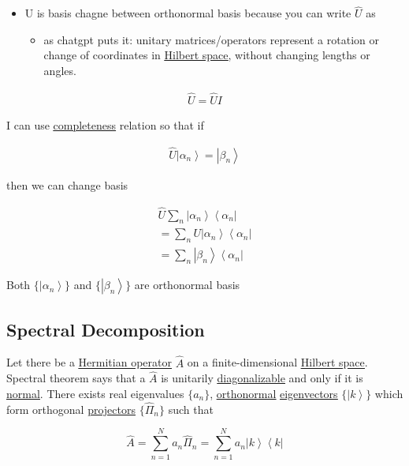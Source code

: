\documentclass[
]{article}
\providecommand{\tightlist}{%
  \setlength{\itemsep}{0pt}\setlength{\parskip}{0pt}}
\let\oldhyperref\hyperref
\renewcommand{\hyperref}[2][]{\oldhyperref[#1]{\underline{#2}}}
\providecommand{\ket}[1]{\left\lvert #1 \right\rangle}
\providecommand{\bra}[1]{\left\langle #1 \right\rvert}
\begin{document}
\begin{itemize}
	\tightlist
	\item
	      U is basis chagne between orthonormal basis because you can write
	      \(\hat{U}\) as

	      \begin{itemize}
		      \tightlist
		      \item
		            as chatgpt puts it: unitary matrices/operators represent a rotation
		            or change of coordinates in \hyperref[hilbert-spaces]{Hilbert space}, without changing lengths
		            or angles.
	      \end{itemize}
\end{itemize}

\begin{gather*}
	\hat{U}=\hat{U}I
\end{gather*}

I can use \hyperref[completeness]{completeness} relation so that if

\begin{gather*}
	\hat{U}\ket{\alpha_n}=\ket{\beta_n}
\end{gather*}

then we can change basis

\begin{gather*}
	\hat{U}\sum_n\ket{\alpha_n}\bra{\alpha_n}\\
	=\sum_nU\ket{\alpha_n}\bra{\alpha_n}\\
	=\sum_n\ket{\beta_n}\bra{\alpha_n}
\end{gather*}

Both \(\{\ket{\alpha_n}\}\) and \(\{\ket{\beta_n}\}\) are orthonormal
basis
\subsection{Spectral Decomposition}\label{spectral-decomposition}
Let there be a \hyperref[hermitian-operators]{Hermitian operator} \(\hat{A}\) on a finite-dimensional \hyperref[hilbert-spaces]{Hilbert space}.
Spectral theorem says that a  \(\hat{A}\) is unitarily \hyperref[diagonalization]{diagonalizable} and only if it is \hyperref[normal-operator]{normal}.
There exists real eigenvalues \(\{a_n\}\), \hyperref[orthonormality]{orthonormal} \hyperref[eigenvectorseigenvalues]{eigenvectors} \(\{\ket{k}\}\) which form orthogonal \hyperref[projectors]{projectors} \(\{\hat{\Pi}_n\}\) such that

\[
	\hat{A}=\sum_{n=1}^N a_n\hat{\Pi}_n=\sum_{n=1}^N a_n\ket{k}\bra{k}
\]
\end{document}
